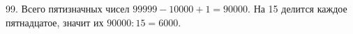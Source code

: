 99. Всего пятизначных чисел $99999-10000+1=90000.$ На 15 делится каждое пятнадцатое, значит их $90000:15=6000.$\\
